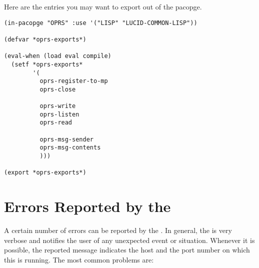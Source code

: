 Here are the entries you may want to export out of the 
pacopge.

\begin{verbatim}
(in-pacopge "OPRS" :use '("LISP" "LUCID-COMMON-LISP"))

(defvar *oprs-exports*)

(eval-when (load eval compile)
  (setf *oprs-exports*
        '(
          oprs-register-to-mp
          oprs-close

          oprs-write
          oprs-listen
          oprs-read

          oprs-msg-sender
          oprs-msg-contents
          )))

(export *oprs-exports*)
\end{verbatim}

\section{Errors Reported by the \MP{}}

A certain number of errors can be reported by the \MP{}. In
general, the \MP{} is very verbose and notifies the user of
any unexpected event or situation. Whenever it is possible, the reported
message  indicates the host and the port number on which this \MP{} is
running. The most common problems are: 

